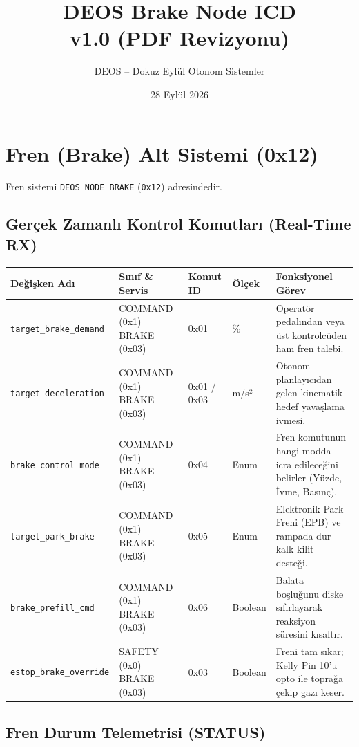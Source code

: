 \documentclass[a4paper,10pt]{article}
\title{\textbf{DEOS Brake Node ICD}\\
\large v1.0 (PDF Revizyonu)}
\author{DEOS -- Dokuz Eylül Otonom Sistemler}
\date{28 Eylül 2026}
\newcommand{\hex}[1]{\texttt{0x#1}}
\newcommand{\code}[1]{\texttt{#1}}
\begin{document}
\maketitle

\section{Fren (Brake) Alt Sistemi (0x12)}

Fren sistemi \code{DEOS\_NODE\_BRAKE} (\hex{12}) adresindedir.

\subsection{Gerçek Zamanlı Kontrol Komutları (Real-Time RX)}

\begin{center}
\begin{tabularx}{\textwidth}{>{\raggedright\arraybackslash}p{3.8cm} >{\raggedright\arraybackslash}p{3cm} >{\raggedright\arraybackslash}p{2.2cm} >{\raggedright\arraybackslash}p{2.2cm} X}
\toprule
\textbf{Değişken Adı} & \textbf{Sınıf \& Servis} & \textbf{Komut ID} & \textbf{Ölçek} & \textbf{Fonksiyonel Görev} \\
\midrule
\code{target\_brake\_demand} & COMMAND (0x1) BRAKE (0x03) & 0x01 & 0.01 \% & Operatör pedalından veya üst kontrolcüden ham fren talebi. \\
\code{target\_deceleration} & COMMAND (0x1) BRAKE (0x03) & 0x01 / 0x03 & 0.01 m/s² & Otonom planlayıcıdan gelen kinematik hedef yavaşlama ivmesi. \\
\code{brake\_control\_mode} & COMMAND (0x1) BRAKE (0x03) & 0x04 & Enum & Fren komutunun hangi modda icra edileceğini belirler (Yüzde, İvme, Basınç). \\
\code{target\_park\_brake} & COMMAND (0x1) BRAKE (0x03) & 0x05 & Enum & Elektronik Park Freni (EPB) ve rampada dur-kalk kilit desteği. \\
\code{brake\_prefill\_cmd} & COMMAND (0x1) BRAKE (0x03) & 0x06 & Boolean & Balata boşluğunu diske sıfırlayarak reaksiyon süresini kısaltır. \\
\code{estop\_brake\_override} & SAFETY (0x0) BRAKE (0x03) & 0x03 & Boolean & Freni tam sıkar; Kelly Pin 10'u opto ile toprağa çekip gazı keser. \\
\bottomrule
\end{tabularx}
\end{center}

\subsection{Fren Durum Telemetrisi (STATUS)}
\end{document}
